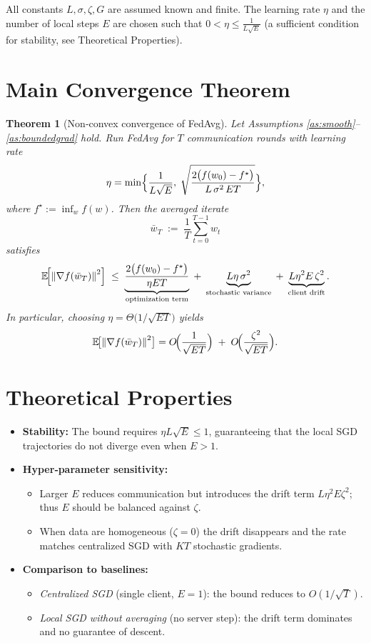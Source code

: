 \documentclass{article}
\newtheorem{theorem}{Theorem}
\newcommand{\E}{\mathbb{E}}
\newcommand{\norm}[1]{\left\|#1\right\|}
\begin{document}
All constants $L,\sigma,\zeta,G$ are assumed known and finite. The learning rate $\eta$ and the number of local steps $E$ are chosen such that $0<\eta\le \frac{1}{L\sqrt{E}}$ (a sufficient condition for stability, see Theoretical Properties).

\section*{Main Convergence Theorem}
\begin{theorem}[Non‑convex convergence of FedAvg]\label{thm:main}
Let Assumptions \ref{as:smooth}–\ref{as:boundedgrad} hold. Run FedAvg for $T$ communication rounds with learning rate
\[
    \eta = \min\Bigl\{\frac{1}{L\sqrt{E}},\; \sqrt{\frac{2\bigl(f(w_0)-f^\star\bigr)}{L\,\sigma^2\,ET}}\Bigr\},
\]
where $f^\star:=\inf_{w} f(w)$. Then the averaged iterate
\[
    \bar w_T \;:=\; \frac{1}{T}\sum_{t=0}^{T-1} w_t
\]
satisfies
\[
    \E\!\Bigl[\norm{\nabla f(\bar w_T)}^2\Bigr]
    \;\le\;
    \underbrace{\frac{2\bigl(f(w_0)-f^\star\bigr)}{\eta ET}}_{\text{optimization term}}
    \;+\;
    \underbrace{L\eta\,\sigma^2}_{\text{stochastic variance}}
    \;+\;
    \underbrace{L\eta^2E\,\zeta^2}_{\text{client drift}} .
\]
In particular, choosing $\eta = \Theta\bigl(1/\sqrt{ET}\bigr)$ yields
\[
    \E\!\bigl[\norm{\nabla f(\bar w_T)}^2\bigr]=
    O\!\Bigl(\frac{1}{\sqrt{ET}}\Bigr)
    \;+\;O\!\Bigl(\frac{\zeta^2}{\sqrt{ET}}\Bigr).
\]
\end{theorem}

\section*{Theoretical Properties}
\begin{itemize}
    \item \textbf{Stability:} The bound requires $\eta L\sqrt{E}\le 1$, guaranteeing that the local SGD trajectories do not diverge even when $E>1$.
    \item \textbf{Hyper‑parameter sensitivity:}
    \begin{itemize}
        \item Larger $E$ reduces communication but introduces the drift term $L\eta^2E\zeta^2$; thus $E$ should be balanced against $\zeta$.
        \item When data are homogeneous ($\zeta=0$) the drift disappears and the rate matches centralized SGD with $KT$ stochastic gradients.
    \end{itemize}
    \item \textbf{Comparison to baselines:}
    \begin{itemize}
        \item \emph{Centralized SGD} (single client, $E=1$): the bound reduces to $O(1/\sqrt{T})$.
        \item \emph{Local SGD without averaging} (no server step): the drift term dominates and no guarantee of descent.
    \end{itemize}
\end{itemize}
\end{document}
